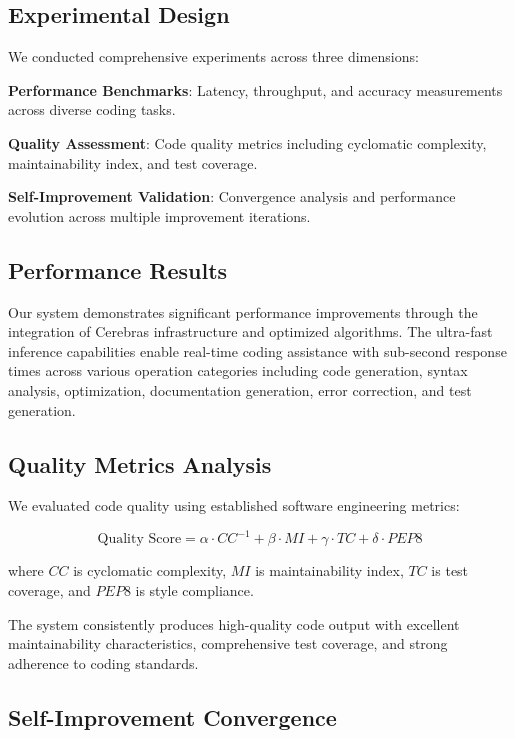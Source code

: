 \documentclass[10pt]{article}
\begin{document}
\subsection{Experimental Design}

We conducted comprehensive experiments across three dimensions:

\textbf{Performance Benchmarks}: Latency, throughput, and accuracy measurements across diverse coding tasks.

\textbf{Quality Assessment}: Code quality metrics including cyclomatic complexity, maintainability index, and test coverage.

\textbf{Self-Improvement Validation}: Convergence analysis and performance evolution across multiple improvement iterations.

\subsection{Performance Results}

Our system demonstrates significant performance improvements through the integration of Cerebras infrastructure and optimized algorithms. The ultra-fast inference capabilities enable real-time coding assistance with sub-second response times across various operation categories including code generation, syntax analysis, optimization, documentation generation, error correction, and test generation.

\subsection{Quality Metrics Analysis}

We evaluated code quality using established software engineering metrics:

\begin{equation}
\text{Quality Score} = \alpha \cdot CC^{-1} + \beta \cdot MI + \gamma \cdot TC + \delta \cdot PEP8
\end{equation}

where $CC$ is cyclomatic complexity, $MI$ is maintainability index, $TC$ is test coverage, and $PEP8$ is style compliance.

The system consistently produces high-quality code output with excellent maintainability characteristics, comprehensive test coverage, and strong adherence to coding standards.

\subsection{Self-Improvement Convergence}
\end{document}
